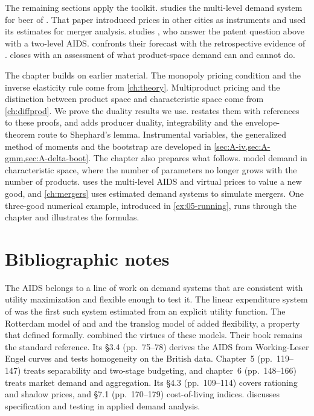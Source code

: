 The remaining sections apply the toolkit.  studies the multi-level demand system for beer of
\citet{HausmanLeonardZona1994}. That paper introduced prices in other cities as instruments and used its estimates
for merger analysis.  studies \citet{ChaudhuriGoldbergJia2006}, who answer the patent question
above with a two-level AIDS.  confronts their forecast with the retrospective evidence of
\citet{DugganGarthwaiteGoyal2016}.  closes with an assessment of what product-space demand
can and cannot do.

The chapter builds on earlier material. The monopoly pricing condition and the inverse elasticity rule come from
\cref{ch:theory}. Multiproduct pricing and the distinction between product space and characteristic space come from
\cref{ch:diffprod}. We prove the duality results we use.  restates them with references to these
proofs, and adds producer duality, integrability and the envelope-theorem route to Shephard's lemma.
Instrumental variables, the generalized method of moments and the bootstrap are developed in
\cref{sec:A-iv,sec:A-gmm,sec:A-delta-boot}. The chapter also prepares what follows.  model demand in
characteristic space, where the number of parameters no longer grows with the number of products. 
uses the multi-level AIDS and virtual prices to value a new good, and \cref{ch:mergers} uses estimated demand
systems to simulate mergers. One three-good numerical example, introduced in \cref{ex:05-running}, runs through the
chapter and illustrates the formulas.






\section{Bibliographic notes}\label{sec:05-bibnotes}

The AIDS belongs to a line of work on demand systems that are consistent with utility maximization and flexible
enough to test it. The linear expenditure system of \citet{Stone1954} was the first such system estimated from an
explicit utility function. The Rotterdam model of \citet{Theil1965} and \citet{Barten1969} and the translog model of
\citet{ChristensenJorgensonLau1975} added flexibility, a property that \citet{Diewert1974} defined formally.
\citet{DeatonMuellbauer1980a} combined the virtues of these models. Their book \citep{DeatonMuellbauer1980b}
remains the standard reference. Its \S 3.4 (pp.~75--78) derives the AIDS from Working-Leser Engel curves and
tests homogeneity on the British data. Chapter~5 (pp.~119--147) treats separability and two-stage budgeting, and
chapter~6 (pp.~148--166) treats market demand and aggregation. Its \S 4.3 (pp.~109--114) covers rationing and shadow
prices, and \S 7.1 (pp.~170--179) cost-of-living indices. \citet{Deaton1978} discusses specification and testing in
applied demand analysis.

